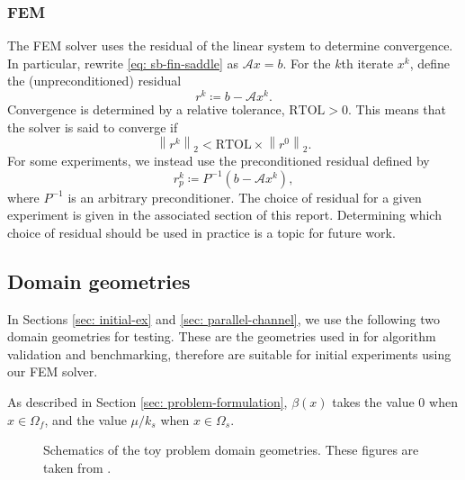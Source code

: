 \documentclass[12pt]{article}
\newcommand\norm[1]{\left\lVert#1\right\rVert}
\renewcommand\brack[1]{\left (#1\right)}
\theoremstyle{theorem}
\begin{document}
\subsubsection{FEM}
The FEM solver uses the residual of the linear system to determine convergence. In particular, rewrite \eqref{eq: sb-fin-saddle} as $\mathcal{A}x = b$. For the $k$th iterate $x^k$, define the (unpreconditioned) residual
\begin{equation}
    r^k \coloneqq b - \mathcal{A}x^k.
\end{equation}
Convergence is determined by a relative tolerance, $\mathrm{RTOL} > 0$. This means that the solver is said to converge if
\begin{equation}
    \norm{r^k}_2 < \mathrm{RTOL} \times \norm{r^0}_2.
\end{equation}
For some experiments, we instead use the preconditioned residual defined by
\begin{equation}\label{eq: precon-res}
    r^k_p \coloneqq P^{-1}\brack{b - \mathcal{A}x^k},
\end{equation}
where $P^{-1}$ is an arbitrary preconditioner. The choice of residual for a given experiment is given in the associated section of this report. Determining which choice of residual should be used in practice is a topic for future work.

\subsection{Domain geometries}

In Sections \ref{sec: initial-ex} and \ref{sec: parallel-channel}, we use the following two domain geometries for testing. These are the geometries used in \cite{chen2023} for algorithm validation and benchmarking, therefore are suitable for initial experiments using our FEM solver.

As described in Section \ref{sec: problem-formulation}, $\beta(x)$ takes the value $0$ when $x \in \Omega_f$, and the value $\mu/k_s$ when $x \in \Omega_s$.

\begin{figure}[H]
    \centering
  
    \hfill
    \caption{Schematics of the toy problem domain geometries. These figures are taken from \cite{chen2023}.}
    \label{fig: domain-geometries} 
\end{figure}
\end{document}
